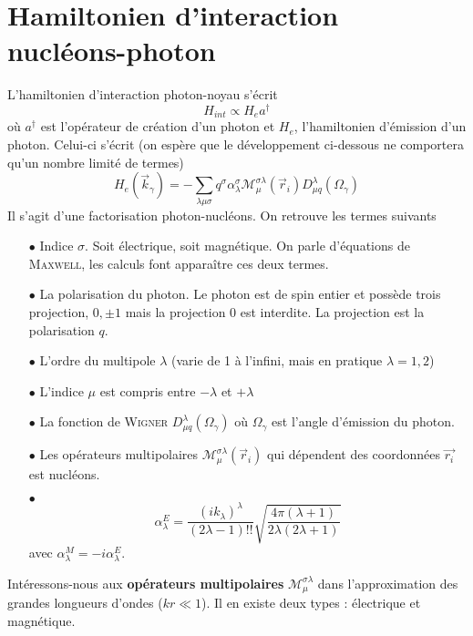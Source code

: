 \section{Hamiltonien d'interaction nucléons-photon}
L'hamiltonien d'interaction photon-noyau s'écrit 
\begin{equation}
H_{int} \propto H_e a^\dagger
\end{equation}
où $a^\dagger$ est l'opérateur de création d'un photon et $H_e$, l'hamiltonien d'émission d'un photon.
Celui-ci s'écrit (on espère que le développement ci-dessous ne comportera qu'un nombre limité de termes)
\begin{equation}
H_e(\vec{k}_\gamma) = -\sum_{\lambda\mu\sigma} q^\sigma \alpha_\lambda^\sigma \mathcal{M}_\mu^{\sigma\lambda}
(\vec{r}_i)D^\lambda_{\mu q}(\Omega_\gamma)
\end{equation}
Il s'agit d'une factorisation photon-nucléons. On retrouve les termes suivants
\begin{itemize}
\item[$\bullet$] Indice $\sigma$. Soit électrique, soit magnétique. On parle d'équations de \textsc{Maxwell}, les
calculs font apparaître ces deux termes.
\item[$\bullet$] La polarisation du photon. Le photon est de spin entier et possède trois projection, 
$0, \pm1$ mais la projection 0 est interdite. La projection est la polarisation $q$. 
\item[$\bullet$] L'ordre du multipole $\lambda$ (varie de 1 à l'infini, mais en pratique $\lambda=1,2$)
\item[$\bullet$] L'indice $\mu$ est compris entre $-\lambda$ et $+\lambda$
\item[$\bullet$] La fonction de \textsc{Wigner} $D_{\mu q}^\lambda(\Omega_\gamma)$ où $\Omega_\gamma$ est 
l'angle d'émission du photon. 
\item[$\bullet$] Les opérateurs multipolaires $\mathcal{M}_\mu^{\sigma\lambda}(\vec{r}_i)$ qui dépendent des
coordonnées $\vec{r_i}$ est nucléons.
\item[$\bullet$]\begin{equation}
\alpha_\lambda^E = \frac{(ik_\lambda)^\lambda}{(2\lambda-1)!!}\sqrt{\dfrac{4\pi(\lambda+1)}{2\lambda(2\lambda+1)}}
\end{equation}
avec $\alpha_\lambda^M = -i\alpha^E_\lambda$.
\end{itemize}


Intéressons-nous aux \textbf{opérateurs multipolaires} $\mathcal{M}_\mu^{\sigma\lambda}$ dans l'approximation
des grandes longueurs d'ondes ($kr \ll 1$). Il en existe deux types : électrique et magnétique.\\

